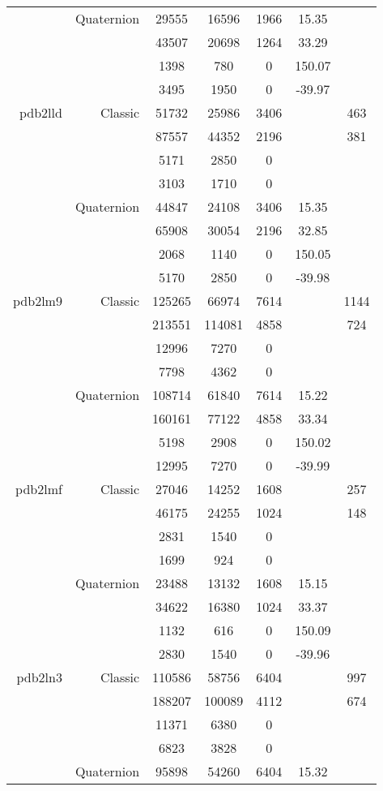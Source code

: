\begin{xltabular}{\textwidth}{r|rcccSc}
& Quaternion & 29555 & 16596 & 1966 & 15.35 & \\
& & 43507 & 20698 & 1264 & 33.29 & \\
& & 1398 & 780 & 0 & 150.07 & \\
& & 3495 & 1950 & 0 & -39.97 & \\ \addlinespace
pdb2lld & Classic & 51732 & 25986 & 3406 & & 463 \\
& & 87557 & 44352 & 2196 & & 381 \\
& & 5171 & 2850 & 0 & & \\
& & 3103 & 1710 & 0 & & \\
& Quaternion & 44847 & 24108 & 3406 & 15.35 & \\
& & 65908 & 30054 & 2196 & 32.85 & \\
& & 2068 & 1140 & 0 & 150.05 & \\
& & 5170 & 2850 & 0 & -39.98 & \\ \addlinespace
pdb2lm9 & Classic & 125265 & 66974 & 7614 & & 1144 \\
& & 213551 & 114081 & 4858 & & 724 \\
& & 12996 & 7270 & 0 & & \\
& & 7798 & 4362 & 0 & & \\
& Quaternion & 108714 & 61840 & 7614 & 15.22 & \\
& & 160161 & 77122 & 4858 & 33.34 & \\
& & 5198 & 2908 & 0 & 150.02 & \\
& & 12995 & 7270 & 0 & -39.99 & \\ \addlinespace
pdb2lmf & Classic & 27046 & 14252 & 1608 & & 257 \\
& & 46175 & 24255 & 1024 & & 148 \\
& & 2831 & 1540 & 0 & & \\
& & 1699 & 924 & 0 & & \\
& Quaternion & 23488 & 13132 & 1608 & 15.15 & \\
& & 34622 & 16380 & 1024 & 33.37 & \\
& & 1132 & 616 & 0 & 150.09 & \\
& & 2830 & 1540 & 0 & -39.96 & \\ \addlinespace
pdb2ln3 & Classic & 110586 & 58756 & 6404 & & 997 \\
& & 188207 & 100089 & 4112 & & 674 \\
& & 11371 & 6380 & 0 & & \\
& & 6823 & 3828 & 0 & & \\
& Quaternion & 95898 & 54260 & 6404 & 15.32 & \\

\end{xltabular}
